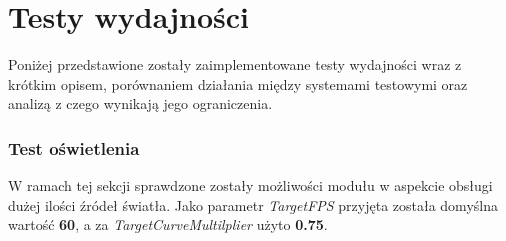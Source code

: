 \chapter{Testy wydajności}
Poniżej przedstawione zostały zaimplementowane testy wydajności wraz z krótkim opisem, porównaniem działania między systemami testowymi oraz analizą z czego wynikają jego ograniczenia.

\subsection{Test oświetlenia}
W ramach tej sekcji sprawdzone zostały możliwości modułu w aspekcie obsługi dużej ilości źródeł światła. Jako parametr \textit{TargetFPS} przyjęta została domyślna wartość \textbf{60}, a za \textit{TargetCurveMultilplier} użyto \textbf{0.75}.